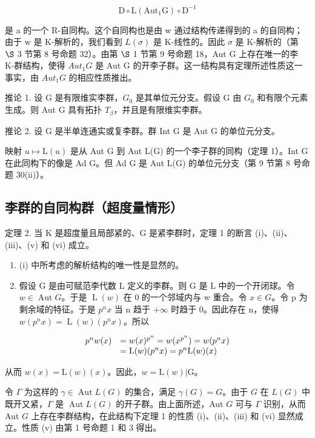 \[
\mathrm{D} \circ \mathrm{L} (\mathrm{Aut} _ {1} \mathrm{G}) \circ \mathrm{D} ^ {- 1}
\]

是 a 的一个 R-自同构。这个自同构也是由 w 通过结构传递得到的 a 的自同构；由于 w 是 K-解析的，我们看到 \(L(\sigma)\) 是 K-线性的。因此 \(\sigma\) 是 K-解析的（第 \(\S\) 3 节第 8 号命题 32）。由第 \(\S\) 1 节第 9 号命题 18，Aut G 上存在唯一的李 K-群结构，使得 \(Aut_1G\) 是 Aut G 的开李子群。这一结构具有定理所述性质这一事实，由 \(Aut_1G\) 的相应性质推出。

推论 1. 设 G 是有限维实李群，\(G_{0}\) 是其单位元分支。假设 G 由 \(G_{0}\) 和有限个元素生成。则 Aut G 具有拓扑 \(T_{\beta}\)，并且是有限维实李群。

推论 2. 设 G 是半单连通实或复李群。群 Int G 是 Aut G 的单位元分支。

映射 \(u \mapsto \mathrm{L}(u)\) 是从 Aut G 到 Aut L(G) 的一个李子群的同构（定理 1）。Int G 在此同构下的像是 Ad G。但 Ad G 是 Aut L(G) 的单位元分支（第 9 节第 8 号命题 30(ii)）。

\subsection{李群的自同构群（超度量情形）}

定理 2. 当 K 是超度量且局部紧的、G 是紧李群时，定理 1 的断言 (i)、(ii)、(iii)、(v) 和 (vi) 成立。

\begin{enumerate}
\def\labelenumi{(\alph{enumi})}
\item
  (i) 中所考虑的解析结构的唯一性是显然的。
\item
  假设 G 是由可赋范李代数 L 定义的李群。则 G 是 L 中的一个开闭球。令 \(w \in \operatorname{Aut} G\)。于是 \(\operatorname{L}(w)\) 在 0 的一个邻域内与 w 重合。令 \(x \in G\)。令 p 为剩余域的特征。于是 \(p^{n}x\) 当 n 趋于 \(+\infty\) 时趋于 0。因此存在 n，使得 \(w(p^{n}x) = \operatorname{L}(w)(p^{n}x)\)。所以
\end{enumerate}

\[
\begin{array}{r l} p ^ {n} w (x) & = w (x) ^ {p ^ {n}} = w (x ^ {p ^ {n}}) = w (p ^ {n} x) \\ & = \mathrm{L} (w) (p ^ {n} x) = p ^ {n} \mathrm{L} (w) (x) \end{array}
\]

从而 \(w(x) = \mathrm{L}(w)(x)\)。因此，\(w = \mathrm{L}(w)|\mathrm{G}\)。

令 \(\Gamma\) 为这样的 \(\gamma \in \operatorname{Aut} L(G)\) 的集合，满足 \(\gamma(G) = G\)。由于 \(G\) 在 \(L(G)\) 中既开又紧，\(\Gamma\) 是 \(\operatorname{Aut} L(G)\) 的开子群。由上面所述，Aut \(G\) 可与 \(\Gamma\) 识别，从而 Aut \(G\) 上存在李群结构，在此结构下定理 1 的性质 (i)、(ii)、(iii) 和 (vi) 显然成立。性质 (v) 由第 1 号命题 1 和 3 得出。

